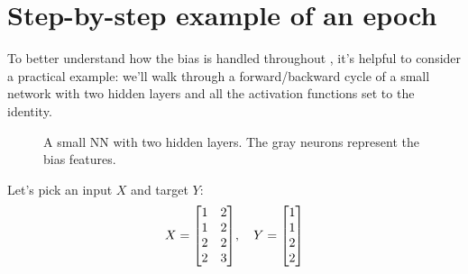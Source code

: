 \section{Step-by-step example of an epoch} \label{sec:example}
To better understand how the bias is handled throughout \mfnet, it's helpful to consider a practical example: we'll walk through a forward/backward cycle of a small network with two hidden layers and all the activation functions set to the identity.

\begin{figure}[h]
    \centering
    \caption{A small \acl{NN} with two hidden layers. The gray neurons represent the bias features.}
    \label{fig:small-nn}
\end{figure}

Let's pick an input $X$ and target $Y$:
\begin{equation*}
    X = \mqty[
        1 & 2 \\
        1 & 2 \\
        2 & 2 \\
        2 & 3
    ], \quad
    Y = \mqty[1 \\ 1 \\ 2 \\ 2]
\end{equation*}

